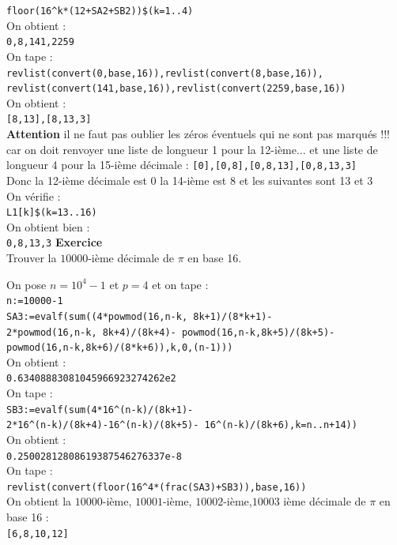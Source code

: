 \documentclass[a4paper,11pt]{book}
\begin{document}
{\tt floor(16\verb|^|k*(12+SA2+SB2))\$(k=1..4)}\\
On obtient :\\
{\tt 0,8,141,2259}\\
On tape :\\
{\tt revlist(convert(0,base,16)),revlist(convert(8,base,16)),
revlist(convert(141,base,16)),revlist(convert(2259,base,16))}\\
On obtient :\\
{\tt [8,13],[8,13,3]}\\
{\bf Attention} il ne faut pas oublier les z\'eros \'eventuels qui ne sont pas
marqu\'es !!! car on doit renvoyer une liste de longueur 1 pour la 12-i\`eme...
et une liste  de longueur 4 pour la 15-i\`eme d\'ecimale : {\tt [0],[0,8],[0,8,13],[0,8,13,3]}\\
Donc la 12-i\`eme d\'ecimale est 0 la 14-i\`eme est 8 et les suivantes sont
13 et 3\\
On v\'erifie :\\
{\tt L1[k]\$(k=13..16)}\\
On obtient bien :\\
{\tt 0,8,13,3}
{\bf Exercice}\\
Trouver la $10000$-i\`eme d\'ecimale de $\pi$ en base 16.

On pose $n=10^4-1$ et $p=4$ et on tape :\\
{\tt n:=10000-1}\\
{\tt  SA3:=evalf(sum((4*powmod(16,n-k, 8k+1)/(8*k+1)-\\
2*powmod(16,n-k, 8k+4)/(8k+4)-
powmod(16,n-k,8k+5)/(8k+5)-
powmod(16,n-k,8k+6)/(8*k+6)),k,0,(n-1)))}\\
On obtient :\\
{\tt  0.63408883081045966923274262e2}\\
On tape :\\
{\tt  SB3:=evalf(sum(4*16\verb|^|(n-k)/(8k+1)-\\
2*16\verb|^|(n-k)/(8k+4)-16\verb|^|(n-k)/(8k+5)-
16\verb|^|(n-k)/(8k+6),k=n..n+14))}\\
On obtient :\\
{\tt  0.25002812808619387546276337e-8}\\
On tape :\\
{\tt revlist(convert(floor(16\verb|^|4*(frac(SA3)+SB3)),base,16)) }\\
On obtient la $10000$-i\`eme, $10001$-i\`eme, $10002$-i\`eme,$10003$ i\`eme d\'ecimale de $\pi$ en base 16 :\\
{\tt [6,8,10,12]}
\end{document}
